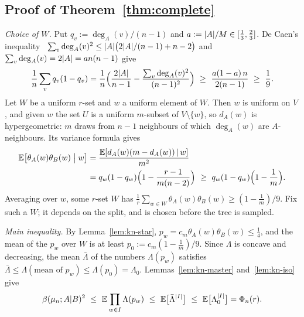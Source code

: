 \subsection{Proof of Theorem~\ref{thm:complete}}

\emph{Choice of $W$.} Put $q_v:=\deg_A(v)/(n-1)$ and $a:=\lvert A\rvert/M\in[\frac13,\frac23]$. De Caen's inequality~\cite{deCaen98} $\sum_v\deg_A(v)^2\le\lvert A\rvert\bigl(2\lvert A\rvert/(n-1)+n-2\bigr)$ and $\sum_v\deg_A(v)=2\lvert A\rvert=an(n-1)$ give
\[
  \frac1n\sum_vq_v(1-q_v)=\frac1n\Bigl(\frac{2\abs A}{n-1}-\frac{\sum_v\deg_A(v)^2}{(n-1)^2}\Bigr)\ \ge\ \frac{a(1-a)\,n}{2(n-1)}\ \ge\ \frac19 .
\]
Let $W$ be a uniform $r$-set and $w$ a uniform element of $W$. Then $w$ is uniform on $V$, and given $w$ the set $U$ is a uniform $m$-subset of $V\setminus\{w\}$, so $d_A(w)$ is hypergeometric: $m$ draws from $n-1$ neighbours of which $\deg_A(w)$ are $A$-neighbours. Its variance formula gives
\begin{align*}
  \E\bigl[\theta_A(w)\theta_B(w)\bigm|w\bigr]&=\frac{\E[d_A(w)(m-d_A(w))\,|\,w]}{m^2}\\
  &=q_w(1-q_w)\Bigl(1-\frac{r-1}{m(n-2)}\Bigr)\ \ge\ q_w(1-q_w)\Bigl(1-\frac1m\Bigr).
\end{align*}
Averaging over $w$, some $r$-set $W$ has $\frac1r\sum_{w\in W}\theta_A(w)\theta_B(w)\ge(1-\frac1m)/9$. Fix such a $W$; it depends on the split, and is chosen before the tree is sampled.

\emph{Main inequality.} By Lemma~\ref{lem:kn-star}, $p_w=c_m\theta_A(w)\theta_B(w)\le\frac14$, and the mean of the $p_w$ over $W$ is at least $p_0:=c_m(1-\frac1m)/9$. Since $\Lambda$ is concave and decreasing, the mean $\bar\Lambda$ of the numbers $\Lambda(p_w)$ satisfies $\bar\Lambda\le\Lambda(\text{mean of }p_w)\le\Lambda(p_0)=\Lambda_0$. Lemmas~\ref{lem:kn-master} and~\ref{lem:kn-iso} give
\[
  \beta(\mu_n;A|B)^2\ \le\ \E\prod_{w\in I}\Lambda(p_w)\ \le\ \E\bigl[\bar\Lambda^{\abs I}\bigr]\ \le\ \E\bigl[\Lambda_0^{\abs I}\bigr]=\Phi_n(r).
\]

